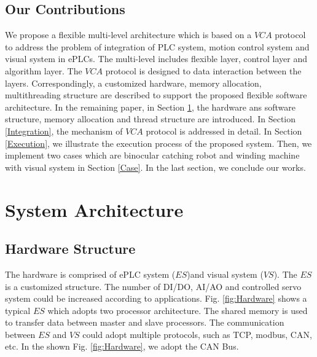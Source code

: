 \documentclass[journal,UTF8]{IEEEtran}
\begin{document}
\subsection{Our Contributions}
We propose a flexible multi-level architecture which is based on a $VCA$ protocol to address the problem of integration of PLC system, motion control system and visual system in ePLCs. The multi-level includes flexible layer, control layer and algorithm layer. The $VCA$ protocol is designed to data interaction between the layers. Correspondingly, a customized hardware, memory allocation, multithreading structure are described to support the proposed flexible software architecture.
In the remaining paper, in Section \ref{SystemStructure}, the hardware ans software structure, memory allocation and thread structure are introduced. In Section \ref{Integration}, the mechanism of $VCA$ protocol is addressed in detail. In Section \ref{Execution}, we illustrate the execution process of the proposed system. Then, we implement two cases which are binocular catching robot and winding machine with visual system in Section \ref{Case}. In the last section, we conclude our works.
%

\section{System Architecture}
\label{SystemStructure}
\subsection{Hardware Structure}
The hardware is comprised of ePLC system ($ES$)and visual system ($VS$). The $ES$ is a customized structure. The number of DI/DO, AI/AO and controlled servo system could be increased according to applications. Fig. \ref{fig:Hardware} shows a typical $ES$ which adopts two processor architecture. The shared memory is used to transfer data between master and slave processors. The communication between $ES$ and $VS$ could adopt multiple protocols, such as TCP, modbus, CAN, etc. In the shown Fig. \ref{fig:Hardware}, we adopt the CAN Bus.
\end{document}

